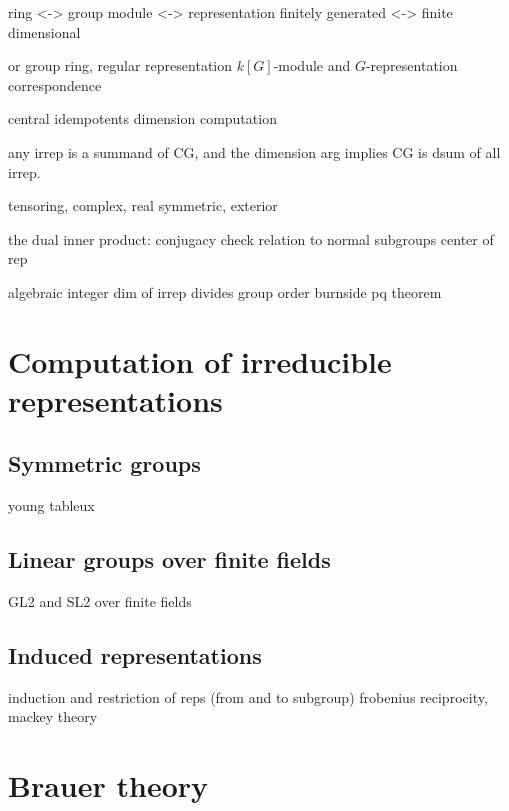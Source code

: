 \documentclass{../note}
\begin{document}
\begin{prb}
ring <-> group
module <-> representation
finitely generated <-> finite dimensional
\end{prb}

\begin{prb}
or group ring,
regular representation
$k[G]$-module and $G$-representation correspondence
\end{prb}

\begin{prb}
central idempotents
dimension computation
\end{prb}
any irrep is a summand of CG, and the dimension arg implies CG is dsum of all irrep.




tensoring, complex, real
symmetric, exterior




the dual inner product: conjugacy check
relation to normal subgroups
center of rep




algebraic integer
dim of irrep divides group order
burnside pq theorem


\chapter{Computation of irreducible representations}
\section{Symmetric groups}
young tableux

\section{Linear groups over finite fields}
GL2 and SL2 over finite fields

\section{Induced representations}
induction and restriction of reps (from and to subgroup)
frobenius reciprocity, mackey theory



\chapter{Brauer theory}
\end{document}
